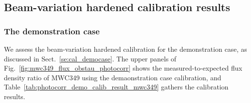 %
%
%
\subsection{Beam-variation hardened calibration results}

\subsubsection{The demonstration case}

We assess the beam-variation hardened calibration for the
demonstration case, as discussed in Sect.~\ref{se:cal_democase}.
The upper panels of Fig.~\ref{fig:mwc349_flux_obstau_photocorr} shows
the measured-to-expected flux density
ratio of MWC349 using the demaonstration case calibration, and
Table~\ref{tab:photocorr_demo_calib_result_mwc349} gathers the
calibration results. 

